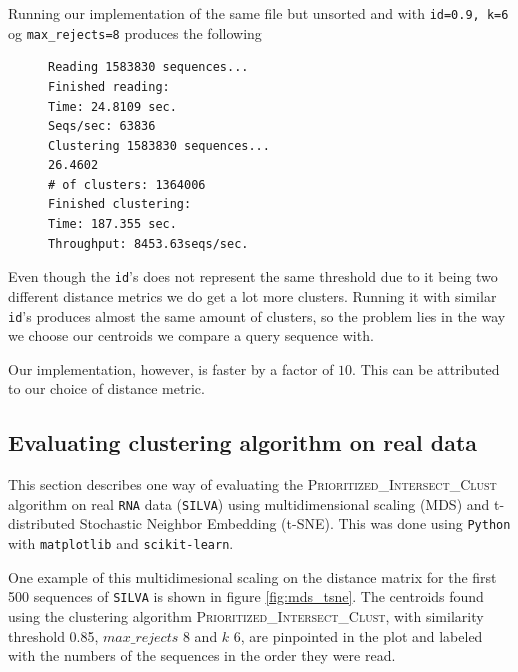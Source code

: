 Running our implementation of the same file but unsorted and with
\texttt{id=0.9, k=6} og \texttt{max\_rejects=8} produces the following

\begin{figure}[H]
\begin{lstlisting}[style=output-style]
Reading 1583830 sequences...
Finished reading:
Time: 24.8109 sec.
Seqs/sec: 63836
Clustering 1583830 sequences...
26.4602
# of clusters: 1364006
Finished clustering:
Time: 187.355 sec.
Throughput: 8453.63seqs/sec.
\end{lstlisting}
\end{figure}

Even though the \texttt{id}'s does not represent the same threshold due to it
being two different distance metrics we do get a lot more clusters. Running
it with similar \texttt{id}'s produces almost the same amount of clusters, so
the problem lies in the way we choose our centroids we compare a query
sequence with.

Our implementation, however, is faster by a factor of $10$. This can be
attributed to our choice of distance metric.


\subsection{Evaluating clustering algorithm on real data}

This section describes one way of evaluating the
\textsc{Prioritized\_Intersect\_Clust} algorithm on real \texttt{RNA} data
(\texttt{SILVA}) using multidimensional scaling (MDS) and t-distributed
Stochastic Neighbor Embedding (t-SNE). This was done using \texttt{Python} with
\texttt{matplotlib} and \texttt{scikit-learn}.

One example of this
multidimesional scaling on the distance matrix for the first 500 sequences of
\texttt{SILVA} is shown in figure \ref{fig:mds_tsne}. The centroids found using
the clustering algorithm \textsc{Prioritized\_Intersect\_Clust}, with similarity
threshold 0.85, $max\_rejects$ 8 and $k$ 6, are pinpointed in the plot and
labeled with the numbers of the sequences in the order they were read.

